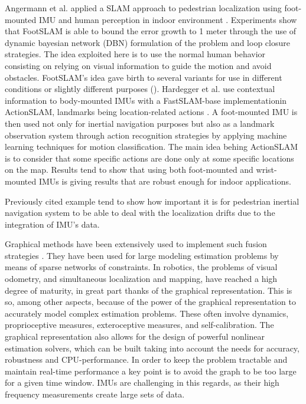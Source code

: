 Angermann et al. applied a SLAM approach to pedestrian localization using foot-mounted IMU and human perception in indoor environment \cite{angermann2012footslam}. Experiments show that
FootSLAM is able to bound the error growth to 1 meter through the use of dynamic bayesian network (DBN) formulation of the problem and loop closure strategies. The idea exploited here is to use the normal human behavior 
consisting on relying on visual information to guide the motion and avoid obstacles. FootSLAM's idea gave birth to several variants for use in different conditions or slightly different purposes (\cite{puyol2012complexity,bruno2011wislam}).
Hardegger et al. use contextual information to body-mounted IMUs with a FastSLAM-base implementationin ActionSLAM, landmarks being location-related actions \cite{hardegger2012actionslam}. 
A foot-mounted IMU is then used not only for inertial navigation purposes but also as a landmark observation system through action recognition strategies by applying machine learning techniques for motion classification.
The main idea behing ActionSLAM is to consider that some specific actions are done only at some specific locations on the map. Results tend to show that using both foot-mounted and wrist-mounted IMUs
is giving results that are robust enough for indoor applications.

Previously cited example tend to show how important it is for pedestrian inertial navigation system to be able to deal with the localization drifts due to the integration of IMU's data.



Graphical methods have been extensively used to implement such fusion strategies \cite{Thrun:ijrr:2006,Kaess:itro:2008}.
They have been used for large modeling estimation problems by means of sparse networks of constraints. 
In robotics, the problems of visual odometry, and simultaneous localization and mapping, have reached a high degree of maturity, 
in great part thanks of the graphical representation. 
This is so, among other aspects, because of the power of the graphical representation to accurately model complex estimation problems. 
These often involve dynamics, proprioceptive measures, exteroceptive measures, and self-calibration.
The graphical representation also allows for the design of powerful nonlinear estimation solvers, which can be built taking into account the needs for accuracy, 
robustness and CPU-performance.
In order to keep the problem tractable and maintain real-time performance a key point is to avoid the graph to be too large for a given time window.
IMUs are challenging in this regards, as their high frequency measurements create large sets of data. 
 
